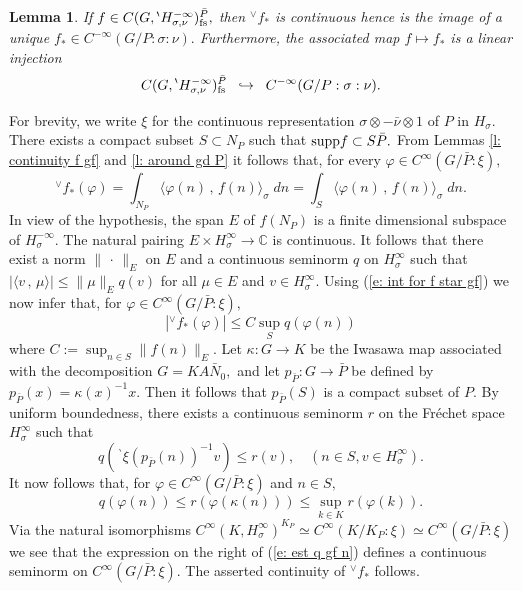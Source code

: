 \documentclass[12pt,a4paper]{article}
\newtheorem{Lemma}[Thm]{Lemma}
\newenvironment{lemma}[0]{\begin{Lemma}\noindent}%
{\end{Lemma}}
\def\proof{\par\noindent{\it Proof.}{\ }{\ }}
\def\msy#1{{\mathbb #1}}
\def\C{{\msy C}}
\def\gf{\varphi}
\def\gs{\sigma}
\def\to{\rightarrow}
\def\inp#1#2{\langle#1\,,\,#2\rangle}
\numberwithin{Thm}{section}
\numberwithin{equation}{section}
\def\supp{{\rm supp}}
\def\dotvar{\, \cdot\,}
\numberwithin{equation}{section}
\def\bp{\!{\,}^\backprime}
\def\fds{{\rm fs}}
\def\veec{\vee}%
\def\trw{{}^{\scriptscriptstyle\veec}}
\begin{document}
 \begin{lemma}
 If $f \in C(G, \bp H_{\gs, \nu}^{-\infty})^{\bar P}_{\fds},$ then $\trw\!f_*$ is continuous
 hence is the image of a unique $f_* \in C^{-\infty}(G/P:\gs: \nu).$ Furthermore, the associated
 map $f \mapsto f_*$ is a linear injection
 $$ 
 C(G, \bp H_{\gs, \nu}^{-\infty})^{\bar P}_{\fds} \;\;\hookrightarrow \;\; C^{-\infty}(G/P:\gs : \nu).
 $$ 
 \end{lemma} 
\proof
For brevity, we write $\xi$ for the continuous representation $\gs \otimes -\bar \nu \otimes 1$
of $P$ in $H_\gs.$ There exists a compact subset $S\subset N_P$ such that $\supp f \subset S \bar P.$
From Lemmas  \ref{l: continuity f gf} and \ref{l: around gd P} it follows
that, for every $\gf \in C^\infty(G/\bar P: \xi),$ 
\begin{equation}
\label{e: int for f star gf}
\trw\! f_*(\gf) = \int_{N_P} \inp{\gf(n)}{f(n)}_\gs\; dn =  \int_S \inp{\gf(n)}{f(n)}_\gs\; dn.
\end{equation} 
In view of the hypothesis, the span $E$ of $f(N_P)$ is a finite dimensional subspace of 
$H^{-\infty}_\gs.$ The natural pairing $E \times H^\infty_\gs \to \C$ 
is continuous. It follows that there exist a norm $\|\dotvar\|_E$ on $E$ and a continuous 
seminorm $q$ on $H^\infty_\gs$ such that $|\inp{v}{\mu} |\leq \|\mu\|_E q (v)$ 
for all $\mu \in E$ and $v\in H_\gs^\infty.$ Using (\ref{e: int for f star gf}) we now infer that, 
for $\gf \in C^\infty(G/\bar P: \xi),$ 
$$ 
|\trw\!f_*(\gf)| \leq C \sup_{S} q (\gf(n))
$$ 
where $C:= \sup_{n \in S} \|f(n)\|_E.$ 
Let $\kappa: G \to K$ be the Iwasawa map associated with the decomposition 
$G = K A \bar N_0,$ and let $p_{\bar P}: G \to \bar P$ be defined by $p_{\bar P} (x) =
\kappa(x)^{-1} x.$ 
Then it follows that $p_{\bar P}(S)$ is a compact subset of $P.$ By uniform boundedness,
there exists a continuous seminorm $r$ on the Fr\'echet space $H_\gs^\infty$ such that 
$$
q(\bp\xi(p_{\bar P}(n))^{-1}v) \leq r(v), \quad (n \in S, v \in H_\gs^\infty).
$$ 
It now follows that, for 
$
\gf \in C^\infty(G/\bar P: \xi)
$
and $n \in S,$ 
\begin{equation}
\label{e: est q gf n}
q(\gf(n)) \leq r (\gf(\kappa(n))) \leq \sup_{k \in K} r (\gf(k)).
\end{equation}
Via the natural isomorphisms $C^\infty(K, H_\gs^\infty)^{K_P} \simeq C^\infty(K/K_P: \xi)
\simeq C^\infty(G/\bar P: \xi)$ we see that the expression on the right
of (\ref{e: est q gf n}) defines a continuous seminorm on $C^\infty(G/\bar P: \xi).$ 
The asserted continuity of $\trw\!f_*$ follows.
\end{document}
